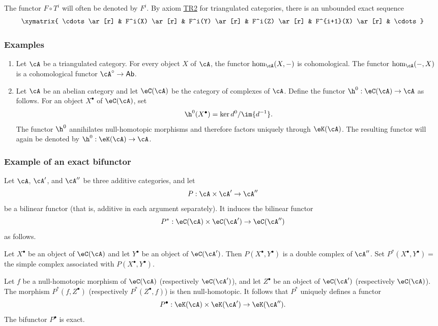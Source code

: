 \documentclass[oneside]{book}
\begin{document}
The functor $F\circ T^i$ will often be denoted by $F^i$. By axiom
\hyperlink{VIII:TR2}{TR2} for triangulated categories, there is an
unbounded exact sequence
\[\xymatrix{
  \cdots \ar[r]
    & F^i(X) \ar[r]
    & F^i(Y) \ar[r]
    & F^i(Z) \ar[r]
    & F^{i+1}(X) \ar[r]
    & \cdots
}\]

\subsubsection{Examples}\label{VIII:1-3-2}

\begin{enumerate}
  \item Let $\cA$ be a triangulated category. For every object $X$ of
    $\cA$, the functor $\hom_\cA(X,-)$ is cohomological. The functor
    $\hom_\cA(-,X)$ is a cohomological functor
    $\cA^\circ\to\mathsf{Ab}$.
  \item Let $\cA$ be an abelian category and let $\eC(\cA)$ be the category
    of complexes of $\cA$. Define the functor
    $\h^0:\eC(\cA)\to\cA$ as follows. For an object $X^\bullet$ of
    $\eC(\cA)$, set
    \[
      \h^0(X^\bullet) = \ker d^0 / \im{d^{-1}} \text{.}
    \]
    The functor $\h^0$ annihilates null-homotopic morphisms and therefore
    factors uniquely through $\eK(\cA)$. The resulting functor will again
    be denoted by $\h^0:\eK(\cA) \to \cA$.
\end{enumerate}

\subsubsection{Example of an exact bifunctor}\label{VIII:1-3-3}

Let $\cA$, $\cA'$, and $\cA''$ be three additive categories, and let
\[
  P:\cA\times \cA'\to \cA''
\]
be a bilinear functor (that is, additive in each argument separately).
It induces the bilinear functor
\[
  P^\ast:\eC(\cA)\times \eC(\cA') \to \eC(\cA'')
\]
as follows.

Let $X^\bullet$ be an object of $\eC(\cA)$ and let $Y^\bullet$ be an
object of $\eC(\cA')$. Then $P(X^\bullet,Y^\bullet)$ is a double complex
of $\cA''$. Set $P^\ast(X^\bullet,Y^\bullet) = $ the simple complex
associated with $P(X^\bullet,Y^\bullet)$.

Let $f$ be a null-homotopic morphism of $\eC(\cA)$ (respectively
$\eC(\cA')$), and let $Z^\bullet$ be an object of $\eC(\cA')$
(respectively $\eC(\cA)$). The morphism $P^\ast(f,Z^\bullet)$
(respectively $P^\ast(Z^\bullet,f)$) is then null-homotopic. It follows
that $P^\ast$ uniquely defines a functor
\[
  P^\bullet:\eK(\cA) \times \eK(\cA') \to \eK(\cA'') \text{.}
\]
The bifunctor $P^\bullet$ is exact.
\end{document}

